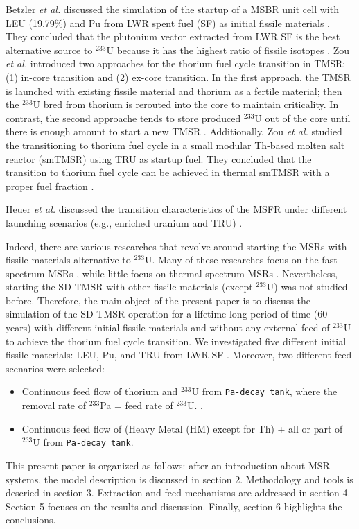 Betzler \emph{et al.} discussed the simulation of the startup of a MSBR unit
cell with \gls{LEU} (19.79\%) and Pu from \gls{LWR} spent fuel (SF) as initial
fissile materials \cite{betzler2016modeling}. They concluded that the 
plutonium vector extracted from LWR SF is the best alternative source to 
$^{233}$U because it has the highest ratio of fissile isotopes
\cite{betzler2016modeling}. Zou \emph{et al.} introduced two approaches for
the thorium fuel cycle transition in \gls{TMSR}: (1) in-core transition and 
(2) ex-core transition. In the first approach, the TMSR is launched with 
existing fissile material and thorium as a fertile material; then the 
$^{233}$U bred from thorium is rerouted into the core to maintain criticality. 
In contrast, the second approache tends to store produced $^{233}$U out of the 
core until there is enough amount to start a new TMSR \cite{zou2018transition}.
Additionally, Zou \emph{et al.} studied the transitioning to thorium fuel
cycle in a small modular Th-based molten salt reactor (smTMSR) using \gls{TRU}
as startup fuel. They concluded that the transition to thorium fuel cycle can
be achieved in thermal smTMSR with a proper fuel fraction 
\cite{zou2018preliminary}.

Heuer \emph{et al.} discussed the transition characteristics of the \gls{MSFR}
under different launching scenarios (e.g., enriched uranium and TRU)
\cite{heuer2014towards}.

Indeed, there are various researches that revolve around starting the
\glspl{MSR} with fissile materials alternative to $^{233}$U. Many of these
researches focus on the fast-spectrum \glspl{MSR} \cite{ashraf2019modeling,
ashraf2018nuclear, rykhlevskii_fuel_2019, betzler_impacts_2019,
heuer2014towards,fiorina2013investigation}, while little focus on
thermal-spectrum \glspl{MSR} \cite{betzler2016modeling, zou2018preliminary,
zou2018transition}. Nevertheless, starting the \gls{SD-TMSR} with other
fissile materials (except $^{233}$U) was not studied before. Therefore,
the main object of the present paper is to discuss the simulation of the
\gls{SD-TMSR} operation for a lifetime-long period of time (60 years) with
different initial fissile materials and without any external feed of $^{233}$U
to achieve the thorium fuel cycle transition. We investigated five different
initial fissile materials: \gls{LEU}, Pu, and \gls{TRU} from LWR SF
\cite{de2000scenarios}. Moreover, two different feed scenarios were selected:
\begin{itemize}
	\item Continuous feed flow of thorium and $^{233}$U from \texttt{Pa-decay tank}, where the removal rate of $^{233}$Pa = feed rate of $^{233}$U. \cite{betzler2016modeling}.
	\item Continuous feed flow of (Heavy Metal (HM) except for Th) + all or part of $^{233}$U from \texttt{Pa-decay tank}.
\end{itemize}
This present paper is organized as follows: after an introduction about \gls{MSR} systems, the model description is discussed in section 2. Methodology and tools is descried in section 3. Extraction and feed mechanisms are addressed in section 4. Section 5 focuses on the results and discussion. Finally, section 6 highlights the conclusions.

